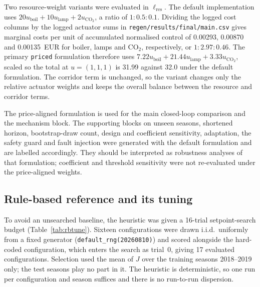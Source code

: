 Two resource-weight variants were evaluated in $\ell_{\mathrm{res}}$. The default
implementation uses
$20u_{\mathrm{boil}}+10u_{\mathrm{lamp}}+2u_{\mathrm{CO}_2}$, a ratio of $1:0.5:0.1$.
Dividing the logged cost columns by the logged actuator sums in
\texttt{regen/results/final/main.csv} gives marginal costs per unit of accumulated
normalised control of 0.00293, 0.00870 and 0.00135~EUR for boiler, lamps and CO$_2$,
respectively, or $1:2.97:0.46$. The primary \texttt{priced} formulation therefore uses
$7.22u_{\mathrm{boil}}+21.44u_{\mathrm{lamp}}+3.33u_{\mathrm{CO}_2}$, scaled so the total
at $u=(1,1,1)$ is 31.99 against 32.0 under the default formulation. The corridor term is
unchanged, so the variant changes only the relative actuator weights and keeps the
overall balance between the resource and corridor terms.

The price-aligned formulation is used for the main closed-loop comparison and the
mechanism block. The supporting blocks on unseen seasons, shortened horizon,
bootstrap-draw count, design and coefficient sensitivity, adaptation, the safety guard and
fault injection were generated with the default formulation and are labelled accordingly.
They should be interpreted as robustness analyses of that formulation; coefficient and
threshold sensitivity were not re-evaluated under the price-aligned weights.

\subsection{Rule-based reference and its tuning}
\label{sec:rbtune}

To avoid an unsearched baseline, the heuristic was given a 16-trial setpoint-search budget
(Table~\ref{tab:rbtune}). Sixteen configurations were drawn i.i.d.\ uniformly from
a fixed generator (\texttt{default\_rng(20260810)}) and scored alongside the hard-coded
configuration, which enters the search as trial~0, giving 17 evaluated configurations.
Selection used the mean of $J$ over the training seasons 2018--2019 only; the test seasons
play no part in it. The heuristic is deterministic, so one run per configuration and season
suffices and there is no run-to-run dispersion.

